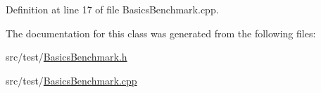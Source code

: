 Definition at line 17 of file Basics\-Benchmark.\-cpp.



The documentation for this class was generated from the following files\-:\begin{DoxyCompactItemize}
\item 
src/test/\hyperlink{_basics_benchmark_8h}{Basics\-Benchmark.\-h}\item 
src/test/\hyperlink{_basics_benchmark_8cpp}{Basics\-Benchmark.\-cpp}\end{DoxyCompactItemize}
